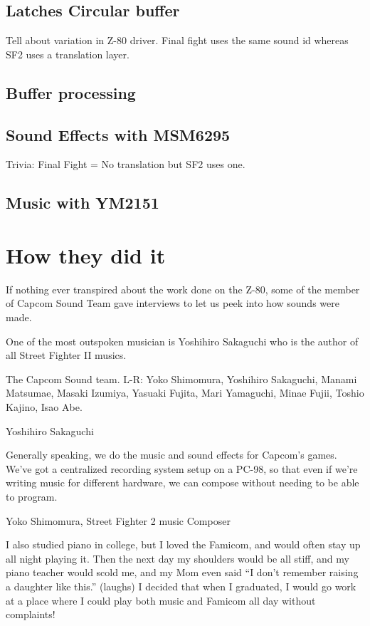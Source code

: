 \subsection{Latches Circular buffer}

Tell about variation in Z-80 driver. Final fight uses the same sound id whereas SF2 uses a translation layer.

\subsection{Buffer processing}

\subsection{Sound Effects with MSM6295}
Trivia: Final Fight = No translation but SF2 uses one.

\subsection{Music with YM2151}

\section{How they did it}
If nothing ever transpired about the work done on the Z-80, some of the member of Capcom Sound Team gave interviews to let us peek into how sounds were made.

One of the most outspoken musician is Yoshihiro Sakaguchi who is the author of all Street Fighter II musics.


The Capcom Sound team. L-R: Yoko Shimomura, Yoshihiro Sakaguchi, Manami Matsumae, Masaki Izumiya, Yasuaki Fujita, Mari Yamaguchi, Minae Fujii, Toshio Kajino, Isao Abe.

\begin{q}{Yoshihiro Sakaguchi\cite{yoko_shimomura_interview}  }

Generally speaking, we do the music and sound effects for Capcom’s games. We’ve got a centralized recording system setup on a PC-98, so that even if we’re writing music for different hardware, we can compose without needing to be able to program.
\end{q}

\begin{q}{Yoko Shimomura, Street Fighter 2 music Composer\cite{beep199010}}

I also studied piano in college, but I loved the Famicom, and would often stay up all night playing it. Then the next day my shoulders would be all stiff, and my piano teacher would scold me, and my Mom even said “I don’t remember raising a daughter like this.” (laughs) I decided that when I graduated, I would go work at a place where I could play both music and Famicom all day without complaints!
\end{q}

